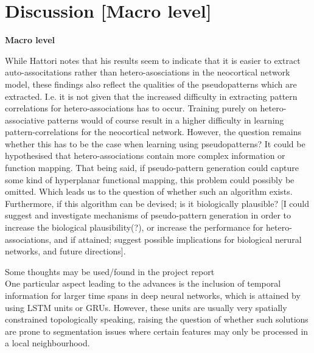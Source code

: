 
\chapter{Discussion [Macro level]}\label{chpt:discussion}
\textbf{Macro level}


While Hattori notes that his results seem to indicate that it is easier to extract auto-associtations rather than hetero-asosciations in the neocortical network model, these findings also reflect the qualities of the pseudopatterns which are extracted. I.e. it is not given that the increased difficulty in extracting pattern correlations for hetero-associations has to occur. Training purely on hetero-associative patterns would of course result in a higher difficulty in learning pattern-correlations for the neocortical network. However, the question remains whether this has to be the case when learning using pseudopatterns? It could be hypothesised that hetero-associations contain more complex information or function mapping. That being said, if pseudo-pattern generation could capture some kind of hyperplanar functional mapping, this problem could possibly be omitted. Which leads us to the question of whether such an algorithm exists. Furthermore, if this algorithm can be devised; is it biologically plausible? [I could suggest and investigate mechanisms of pseudo-pattern generation in order to increase the biological plausibility(?), or increase the performance for hetero-associations, and if attained; suggest possible implications for biological nerural networks, and future directions].

Some thoughts may be used/found in the project report
\\

One particular aspect leading to the advances is the inclusion of temporal information for larger time spans in deep neural networks, which is attained by using LSTM units or GRUs. However, these units are usually very spatially constrained topologically speaking, raising the question of whether such solutions are prone to segmentation issues where certain features may only be processed in a local neighbourhood.
\\\\

